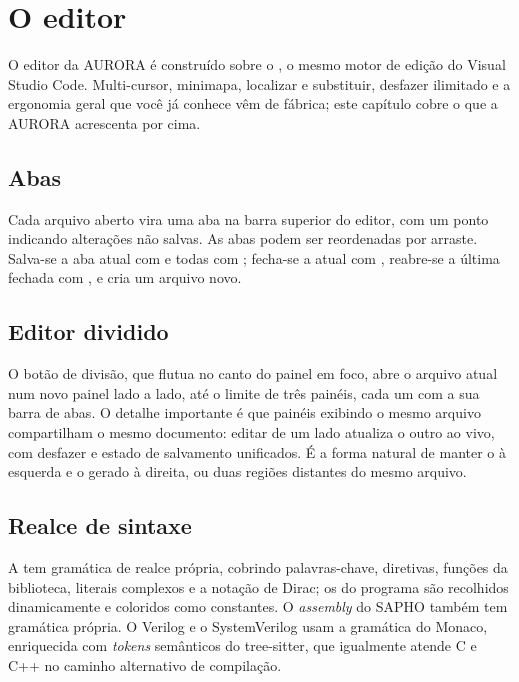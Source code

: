 \chapter{O editor}
\label{cap:editor}

O editor da AURORA é construído sobre o , o mesmo motor de edição do Visual Studio Code. Multi-cursor, minimapa, localizar e substituir, desfazer ilimitado e a ergonomia geral que você já conhece vêm de fábrica; este capítulo cobre o que a AURORA acrescenta por cima.

\section{Abas}

Cada arquivo aberto vira uma aba na barra superior do editor, com um ponto indicando alterações não salvas. As abas podem ser reordenadas por arraste. Salva-se a aba atual com  e todas com ; fecha-se a atual com , reabre-se a última fechada com , e  cria um arquivo novo.

\section{Editor dividido}
\label{sec:split}

O botão de divisão, que flutua no canto do painel em foco, abre o arquivo atual num novo painel lado a lado, até o limite de três painéis, cada um com a sua barra de abas. O detalhe importante é que painéis exibindo o mesmo arquivo compartilham o mesmo documento: editar de um lado atualiza o outro ao vivo, com desfazer e estado de salvamento unificados. É a forma natural de manter o  à esquerda e o  gerado à direita, ou duas regiões distantes do mesmo arquivo.


\section{Realce de sintaxe}

A \cmm{} tem gramática de realce própria, cobrindo palavras-chave, diretivas, funções da biblioteca, literais complexos e a notação de Dirac; os  do programa são recolhidos dinamicamente e coloridos como constantes. O \textit{assembly} do SAPHO também tem gramática própria. O Verilog e o SystemVerilog usam a gramática do Monaco, enriquecida com \textit{tokens} semânticos do tree-sitter, que igualmente atende C e C++ no caminho alternativo de compilação.

